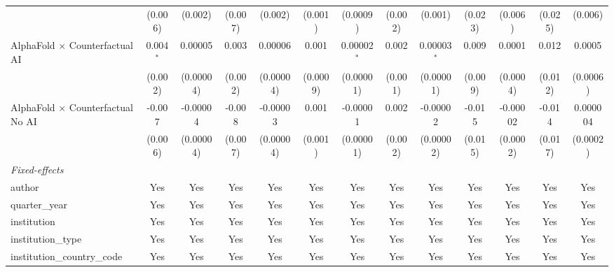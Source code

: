 \begin{tabular}{lcccccccccccc}
                                            & (0.006)       & (0.002)        & (0.007)      & (0.002)        & (0.001)      & (0.0009)      & (0.002)      & (0.001)       & (0.023) & (0.006)  & (0.025) & (0.006)\\   
   AlphaFold $\times$ Counterfactual AI     & 0.004$^{*}$   & 0.00005        & 0.003        & 0.00006        & 0.001        & 0.00002$^{*}$ & 0.002        & 0.00003$^{*}$ & 0.009   & 0.0001   & 0.012   & 0.0005\\   
                                            & (0.002)       & (0.00004)      & (0.002)      & (0.00004)      & (0.0009)     & (0.00001)     & (0.001)      & (0.00001)     & (0.009) & (0.0004) & (0.012) & (0.0006)\\   
   AlphaFold $\times$ Counterfactual No AI  & -0.007        & -0.00004       & -0.008       & -0.00003       & 0.001        & -0.00001      & 0.002        & -0.00002      & -0.015  & -0.00002 & -0.014  & 0.000004\\   
                                            & (0.006)       & (0.00004)      & (0.007)      & (0.00004)      & (0.001)      & (0.00001)     & (0.002)      & (0.00002)     & (0.015) & (0.0002) & (0.017) & (0.0002)\\   
   \midrule
   \emph{Fixed-effects}\\
   author                                   & Yes           & Yes            & Yes          & Yes            & Yes          & Yes           & Yes          & Yes           & Yes     & Yes      & Yes     & Yes\\  
   quarter\_year                            & Yes           & Yes            & Yes          & Yes            & Yes          & Yes           & Yes          & Yes           & Yes     & Yes      & Yes     & Yes\\  
   institution                              & Yes           & Yes            & Yes          & Yes            & Yes          & Yes           & Yes          & Yes           & Yes     & Yes      & Yes     & Yes\\  
   institution\_type                        & Yes           & Yes            & Yes          & Yes            & Yes          & Yes           & Yes          & Yes           & Yes     & Yes      & Yes     & Yes\\  
   institution\_country\_code               & Yes           & Yes            & Yes          & Yes            & Yes          & Yes           & Yes          & Yes           & Yes     & Yes      & Yes     & Yes\\  

\end{tabular}
